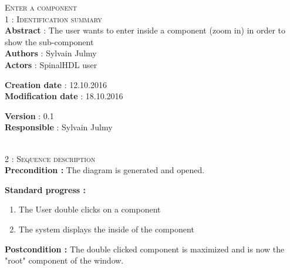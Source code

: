 \begin{flushleft}
    \textsc{\huge Enter a component}\\[0.5cm]

    \BlackLine
    \textsc{\Large 1 : Identification summary}\\[0.3cm]

        \textbf{\large Abstract} : The user wants to enter inside a component (zoom in) in order to show the sub-component \\[0.1cm]

        \textbf{\large Authors} : Sylvain Julmy \\[0.3cm]

        \textbf{\large Actors} : SpinalHDL user \\[0.1cm]

    \begin{minipage}{0.40\textwidth}
        \begin{flushleft}	
            \textbf{\large Creation date} : 12.10.2016 \\[0.1cm]

            \textbf{\large Modification date} : 18.10.2016 \\[0.1cm]
        \end{flushleft}
    \end{minipage}
    \begin{minipage}{0.40\textwidth}
        \begin{flushleft}
            \textbf{\large Version} : 0.1 \\[0.1cm]

            \textbf{\large Responsible} : Sylvain Julmy \\[0.1cm]
        \end{flushleft}
    \end{minipage}
    \\[0.5cm]
    \BlackLine
    \textsc{\Large 2 : Sequence description}\\[0.3cm]

    \textbf{\large Precondition :} The diagram is generated and opened.

    \textbf{\large  Standard progress :}
    \begin{enumerate}[nosep]
        \item The User double clicks on a component
        \item The system displays the inside of the component
    \end{enumerate}

    \textbf{\large Postcondition :} The double clicked component is maximized and is now the "root" component of the window.


\end{flushleft}
